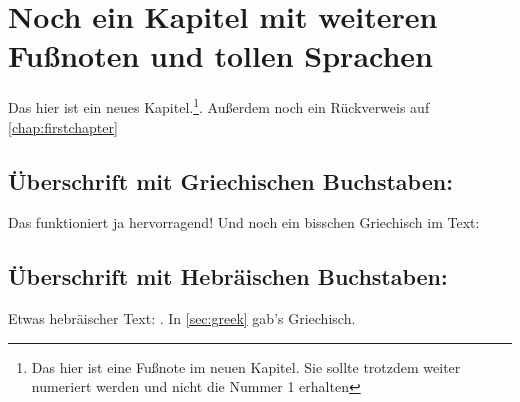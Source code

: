 \documentclass{scrreport}
\begin{document}
\chapter{Noch ein Kapitel mit weiteren Fußnoten und tollen Sprachen}
Das hier ist ein neues Kapitel.\footnote{Das hier ist eine Fußnote im neuen Kapitel. Sie sollte trotzdem weiter numeriert werden und nicht die Nummer 1 erhalten}. Außerdem noch ein Rückverweis auf \autoref{chap:firstchapter}

\section{Überschrift mit Griechischen Buchstaben: }
\label{sec:greek}
Das funktioniert ja hervorragend! Und noch ein bisschen Griechisch im Text: 

\section{Überschrift mit Hebräischen Buchstaben: }
Etwas hebräischer Text: . In \autoref{sec:greek} gab's Griechisch.


\end{document}

